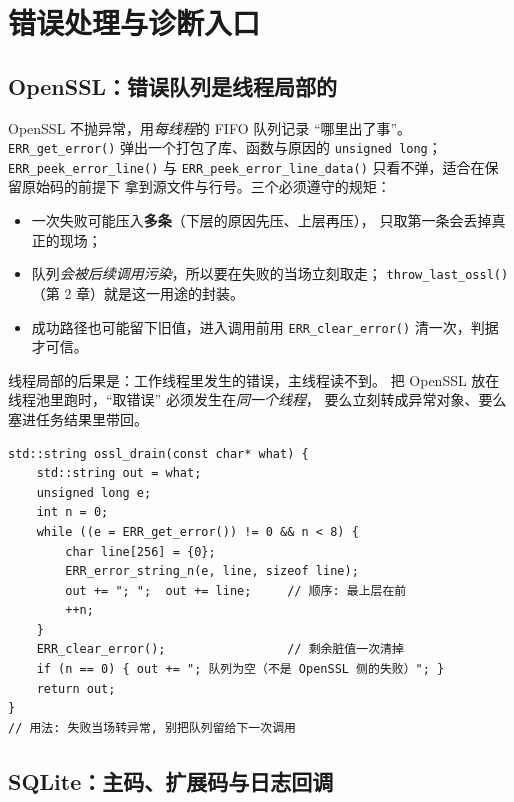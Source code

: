 \documentclass[12pt,a4paper,fontset=fandol]{ctexbook}
\newcommand{\Fn}[1]{\texttt{#1()}}
\newcommand{\Tp}[1]{\texttt{#1}}
\begin{document}

\chapter{错误处理与诊断入口}

\section{OpenSSL：错误队列是线程局部的}

OpenSSL 不抛异常，用\emph{每线程}的 FIFO 队列记录 ``哪里出了事''。
\Fn{ERR\_\allowbreak{}get\_\allowbreak{}error} 弹出一个打包了库、函数与原因的
\Tp{unsigned long}；\Fn{ERR\_\allowbreak{}peek\_\allowbreak{}error\_\allowbreak{}line} 与
\Fn{ERR\_\allowbreak{}peek\_\allowbreak{}error\_\allowbreak{}line\_\allowbreak{}data} 只看不弹，适合在保留原始码的前提下
拿到源文件与行号。三个必须遵守的规矩：

\begin{itemize}
  \item 一次失败可能压入\textbf{多条}（下层的原因先压、上层再压），
        只取第一条会丢掉真正的现场；
  \item 队列\emph{会被后续调用污染}，所以要在失败的当场立刻取走；
        \Fn{throw\_last\_ossl}（第 2 章）就是这一用途的封装。
  \item 成功路径也可能留下旧值，进入调用前用 \Fn{ERR\_clear\_error}
        清一次，判据才可信。
\end{itemize}

线程局部的后果是：工作线程里发生的错误，主线程读不到。
把 OpenSSL 放在线程池里跑时，``取错误'' 必须发生在\emph{同一个线程}，
要么立刻转成异常对象、要么塞进任务结果里带回。

\begin{lstlisting}[caption={C/C++：把整条错误队列并成一条消息（弹出, 不泄漏）}]
std::string ossl_drain(const char* what) {
    std::string out = what;
    unsigned long e;
    int n = 0;
    while ((e = ERR_get_error()) != 0 && n < 8) {
        char line[256] = {0};
        ERR_error_string_n(e, line, sizeof line);
        out += "; ";  out += line;     // 顺序: 最上层在前
        ++n;
    }
    ERR_clear_error();                 // 剩余脏值一次清掉
    if (n == 0) { out += "; 队列为空（不是 OpenSSL 侧的失败）"; }
    return out;
}
// 用法: 失败当场转异常, 别把队列留给下一次调用
\end{lstlisting}

\section{SQLite：主码、扩展码与日志回调}
\end{document}
